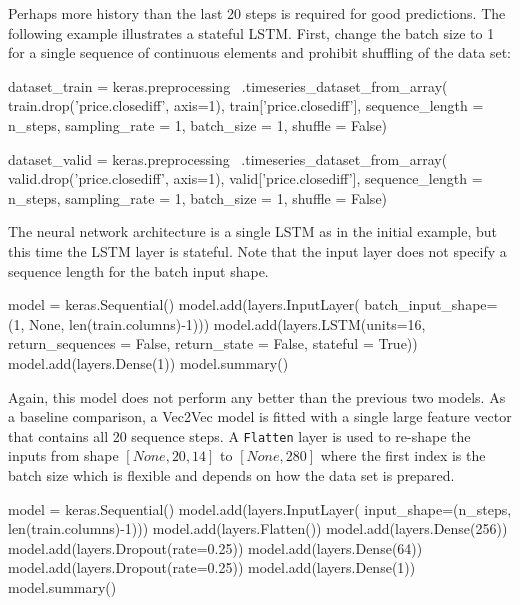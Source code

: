Perhaps more history than the last 20 steps is required for good predictions. The following example illustrates a stateful LSTM. First, change the batch size to 1 for a single sequence of continuous elements and prohibit shuffling of the data set:

\begin{samepage}
\begin{pythoncode}
dataset_train = keras.preprocessing \
    .timeseries_dataset_from_array(
        train.drop('price.closediff', axis=1),
        train['price.closediff'],
        sequence_length = n_steps,
        sampling_rate = 1, 
        batch_size = 1, 
        shuffle = False)
\end{pythoncode}
\end{samepage}

\begin{samepage}
\begin{pythoncode}
dataset_valid = keras.preprocessing \
    .timeseries_dataset_from_array(
        valid.drop('price.closediff', axis=1),
        valid['price.closediff'],
        sequence_length = n_steps,
        sampling_rate = 1, 
        batch_size = 1, 
        shuffle = False)
\end{pythoncode}
\end{samepage}

The neural network architecture is a single LSTM as in the initial example, but this time the LSTM layer is stateful. Note that the input layer does not specify a sequence length for the batch input shape.

\begin{samepage}
\begin{pythoncode}
model = keras.Sequential()
model.add(layers.InputLayer(
    batch_input_shape=(1, None, len(train.columns)-1)))
model.add(layers.LSTM(units=16,
    return_sequences = False, 
    return_state = False, 
    stateful = True))
model.add(layers.Dense(1))
model.summary()
\end{pythoncode}
\end{samepage}

Again, this model does not perform any better than the previous two models. As a baseline comparison, a Vec2Vec model is fitted with a single large feature vector that contains all 20 sequence steps. A \texttt{Flatten} layer is used to re-shape the inputs from shape $[None, 20, 14]$ to $[None, 280]$ where the first index is the batch size which is flexible and depends on how the data set is prepared.

\begin{samepage}
\begin{pythoncode}
model = keras.Sequential()
model.add(layers.InputLayer(
    input_shape=(n_steps, len(train.columns)-1)))
model.add(layers.Flatten())
model.add(layers.Dense(256))
model.add(layers.Dropout(rate=0.25))
model.add(layers.Dense(64))
model.add(layers.Dropout(rate=0.25))
model.add(layers.Dense(1))
model.summary()
\end{pythoncode}
\end{samepage}

